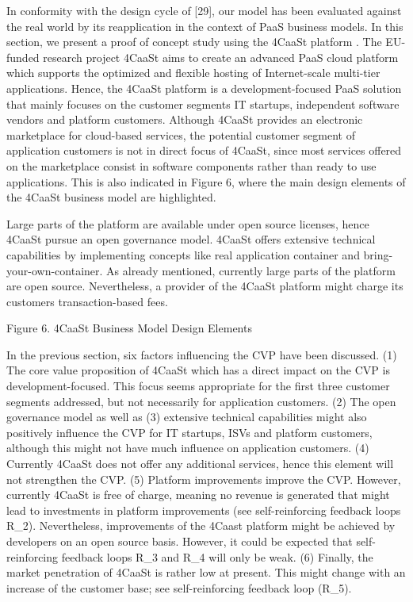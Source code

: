 In conformity with the design cycle of [29], our model has been evaluated against the real world by its reapplication in the context of PaaS business models. In this section, we present a proof of concept study using the 4CaaSt platform . The EU-funded research project 4CaaSt aims to create an advanced PaaS cloud platform which supports the optimized and flexible hosting of Internet-scale multi-tier applications. Hence, the 4CaaSt platform is a development-focused PaaS solution that mainly focuses on the customer segments IT startups, independent software vendors and platform customers. Although 4CaaSt provides an electronic marketplace for cloud-based services, the potential customer segment of application customers is not in direct focus of 4CaaSt, since most services offered on the marketplace consist in software components rather than ready to use applications. This is also indicated in Figure 6, where the main design elements of the 4CaaSt business model are highlighted.

Large parts of the platform are available under open source licenses, hence 4CaaSt pursue an open governance model. 4CaaSt offers extensive technical capabilities by implementing concepts like real application container and bring-your-own-container. As already mentioned, currently large parts of the platform are open source. Nevertheless, a provider of the 4CaaSt platform might charge its customers transaction-based fees.
 
Figure 6. 4CaaSt Business Model Design Elements

In the previous section, six factors influencing the CVP have been discussed. (1) The core value proposition of 4CaaSt which has a direct impact on the CVP is development-focused. This focus seems appropriate for the first three customer segments addressed, but not necessarily for application customers. (2) The open governance model as well as (3) extensive technical capabilities might also positively influence the CVP for IT startups, ISVs and platform customers, although this might not have much influence on application customers. (4) Currently 4CaaSt does not offer any additional services, hence this element will not strengthen the CVP. (5) Platform improvements improve the CVP. However, currently 4CaaSt is free of charge, meaning no revenue is generated that might lead to investments in platform improvements (see self-reinforcing feedback loops R\_2). Nevertheless, improvements of the 4Caast platform might be achieved by developers on an open source basis. However, it could be expected that self-reinforcing feedback loops R\_3 and R\_4 will only be weak. (6) Finally, the market penetration of 4CaaSt is rather low at present. This might change with an increase of the customer base; see self-reinforcing feedback loop (R\_5).
 
